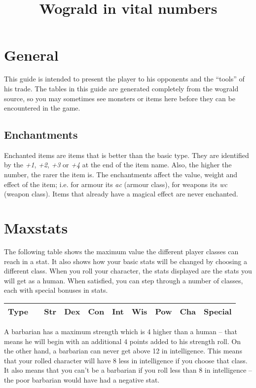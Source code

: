 \documentclass[11pt, a4paper]{article}
\begin{document}
\title{Wograld in vital numbers}
\author{

}
\maketitle
{}
\setlongtables


\section*{General}
This guide is intended to present the player to his opponents and the
``tools'' of his trade.  The tables in this guide are generated
completely from the wograld source, so you may sometimes see
monsters or items here before they can be encountered in the game.

\subsection*{Enchantments}
Enchanted items are items that is better than the basic type.
They are identified by the {\it +1}, {\it +2}, {\it +3} or {\it +4} at 
the end of the item name.
Also, the higher the number, the rarer the item is.
The enchantments affect the value, weight and effect of the item;
i.e. for armour its {\it ac} (armour class),
for weapons its {\it wc} (weapon class).
Items that already have a magical effect are never enchanted.


\section*{Maxstats}

The following table shows the maximum value the different player
classes can reach in a stat. It also shows how your basic stats will
be changed by choosing a different class. When you roll your
character, the stats displayed are the stats you will get as a human.
When satisfied, you can step through a number of classes, each with
special bonuses in stats.

{\small 
\begin{center}
\begin{tabular}{|c|c|l|l|l|l|l|l|l|p{4cm}|}
\hline
Type& &         Str&    Dex&    Con&    Int&    Wis&    Pow& Cha &Special\\
\hline
\hline

\hline
\end{tabular}
\end{center}
}

A barbarian has a maximum strength which is 4 higher than a human --
that means he will begin with an additional 4 points added to his
strength roll. On the other hand, a barbarian can never get above 12
in intelligence.  This means that your rolled character will have 8
less in intelligence if you choose that class.  It also means that you
can't be a barbarian if you roll less than 8 in intelligence -- the
poor barbarian would have had a negative stat.
\end{document}
